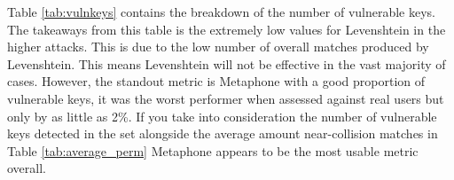 
\begin{table}[!h]
    \centering

    \caption{Number of vulnerable keys per metric}
    \label{tab:vulnkeys}
\end{table}

Table \ref{tab:vulnkeys} contains the breakdown of the number of vulnerable keys. The takeaways from this table is the extremely low values for Levenshtein in the higher attacks. This is due to the low number of overall matches produced by Levenshtein. This means Levenshtein will not be effective in the vast majority of cases. However, the standout metric is Metaphone with a good proportion of vulnerable keys, it was the worst performer when assessed against real users but only by as little as 2\%. If you take into consideration the number of vulnerable keys detected in the set alongside the average amount near-collision matches in Table \ref{tab:average_perm} Metaphone appears to be the most usable metric overall.

